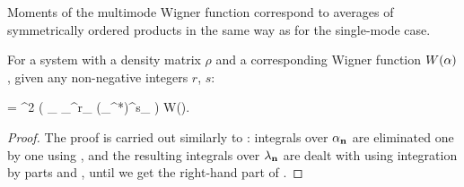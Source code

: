 Moments of the multimode Wigner function correspond to averages of symmetrically ordered products in the same way as for the single-mode case.

\begin{theorem}
\label{thm:mm-wigner:mm:moments}
	For a system with a density matrix $\rho$ and a corresponding Wigner function $W(\mathbf{\alpha})$, given any non-negative integers $r$, $s$:
	\begin{eqn*}
		\left\langle {} \right\rangle
		= \int \upd^2 \balpha
			\left(
				\prod_{\nvec \in \restbasis} \alpha_{\nvec}^{r_{\nvec}} (\alpha_{\nvec}^*)^{s_{\nvec}}
			\right) W(\balpha).
	\end{eqn*}
\end{theorem}
\begin{proof}
The proof is carried out similarly to : integrals over $\alpha_{\mathbf{n}}$ are eliminated one by one using , and the resulting integrals over $\lambda_{\mathbf{n}}$ are dealt with using integration by parts and , until we get the right-hand part of .
\end{proof}
